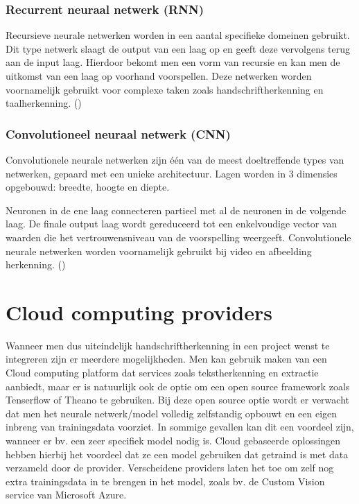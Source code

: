 \subsubsection{Recurrent neuraal netwerk (RNN)}
Recursieve neurale netwerken worden in een aantal specifieke domeinen gebruikt. Dit type netwerk slaagt de output van een laag op en geeft deze vervolgens terug aan de input laag. Hierdoor bekomt men een vorm van recursie en kan men de uitkomst van een laag op voorhand voorspellen. Deze netwerken worden voornamelijk gebruikt voor complexe taken zoals handschriftherkenning en taalherkenning. (\cite{Microsoft2020d})  
\subsubsection{Convolutioneel neuraal netwerk (CNN)}
Convolutionele neurale netwerken zijn één van de meest doeltreffende types van netwerken, gepaard met een unieke architectuur. Lagen worden in 3 dimensies opgebouwd: breedte, hoogte en diepte. 

Neuronen in de ene laag connecteren partieel met al de neuronen in de volgende laag. De finale output laag wordt gereduceerd tot een enkelvoudige vector van waarden die het vertrouwensniveau van de voorspelling weergeeft. Convolutionele neurale netwerken worden voornamelijk gebruikt bij video en afbeelding herkenning. (\cite{Microsoft2020d}) 






\section{Cloud computing providers}
Wanneer men dus uiteindelijk handschriftherkenning in een project wenst te integreren zijn er meerdere mogelijkheden. Men kan gebruik maken van een Cloud computing platform dat services zoals tekstherkenning en extractie aanbiedt, maar er is natuurlijk ook de optie om een open source framework zoals Tenserflow of Theano te gebruiken. Bij deze open source optie wordt er verwacht dat men het neurale netwerk/model volledig zelfstandig opbouwt en een eigen inbreng van trainingsdata voorziet. In sommige gevallen kan dit een voordeel zijn, wanneer er bv. een zeer specifiek model nodig is. Cloud gebaseerde oplossingen hebben hierbij het voordeel dat ze een model gebruiken dat getraind is met data verzameld door de provider. Verscheidene providers laten het toe om zelf nog extra trainingsdata in te brengen in het model, zoals bv. de Custom Vision service van Microsoft Azure. 



